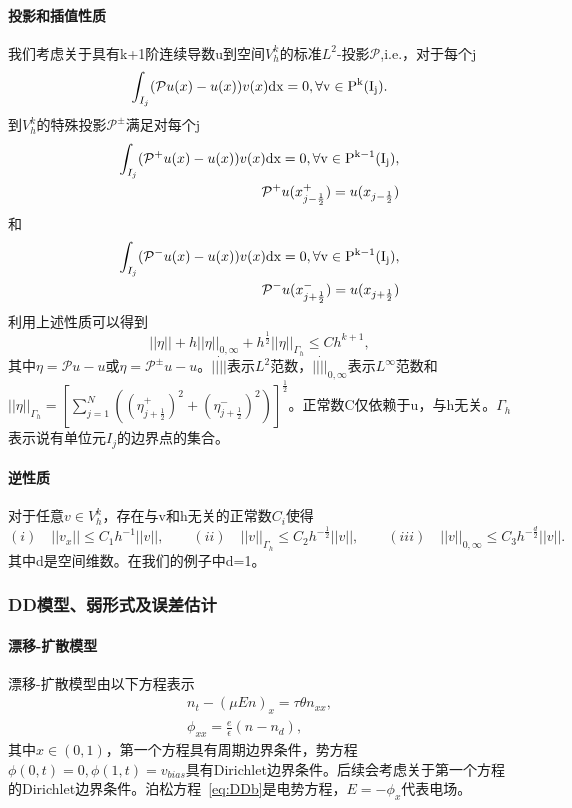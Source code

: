 \paragraph{投影和插值性质}
我们考虑关于具有k+1阶连续导数u到空间$V_h^k$的标准$L^2$-投影$\mathcal{P}$,i.e.，对于每个j
\begin{equation*}
    \int_{I_j}(\mathcal{P}u(x) - u(x))v(x)\rm{d} x = 0, \forall v \in P^k(I_j).
\end{equation*}
到$V_h^k$的特殊投影$\mathcal{P}^{\pm}$满足对每个j
\begin{align*}
    \int_{I_j}(\mathcal{P}^+u(x) - u(x))v(x)\rm{d} x = 0, \forall v \in P^{k-1}(I_j), \\
    \mathcal{P}^+u(x_{j-\frac{1}{2}}^+) = u(x_{j-\frac{1}{2}})
\end{align*}
和
\begin{align*}
    \int_{I_j}(\mathcal{P}^-u(x) - u(x))v(x)\rm{d} x = 0, \forall v \in P^{k-1}(I_j), \\
    \mathcal{P}^-u(x_{j+\frac{1}{2}}^-) = u(x_{j+\frac{1}{2}})
\end{align*}
利用上述性质可以得到
\begin{equation}
    ||\eta|| + h||\eta||_{0,\infty} + h^{\frac{1}{2}}||\eta||_{\Gamma_h} \leq Ch^{k+1},
\end{equation}
其中$\eta = \mathcal{P}u - u$或$\eta = \mathcal{P}^{\pm}u - u$。$||\dot||$表示$L^2$范数，$||\dot||_{0,\infty}$表示$L^{\infty}$范数和$||\eta||_{\Gamma_h} = [\sum_{j=1}^{N}((\eta_{j+\frac{1}{2}}^+)^2 + (\eta_{j+\frac{1}{2}}^-)^2)]^{\frac{1}{2}}$。正常数C仅依赖于u，与h无关。$\Gamma_h$表示说有单位元$I_j$的边界点的集合。
\paragraph{逆性质}
对于任意$v \in V_h^k$，存在与v和h无关的正常数$C_i$使得
\begin{equation}
    (i)\quad  ||v_x|| \leq C_1 h^{-1} ||v||, \qquad
    (ii)\quad||v||_{\Gamma_h} \leq C_2 h^{-\frac{1}{2}}||v||, \qquad
    (iii)\quad ||v||_{0,\infty} \leq C_3 h^{-\frac{d}{2}}||v||.
\end{equation}
其中d是空间维数。在我们的例子中d=1。

\subsubsection{DD模型、弱形式及误差估计}
\paragraph{漂移-扩散模型}
漂移-扩散模型由以下方程表示
\begin{align}
    n_t - (\mu En)_x = \tau \theta n_{xx}, \label{eq:DDa} \\
    \phi_{xx} = \frac{e}{\epsilon}(n - n_d),  \label{eq:DDb}
\end{align}
其中$x \in (0,1)$，第一个方程具有周期边界条件，势方程$\phi(0,t) = 0, \phi(1,t) = v_{bias}$具有Dirichlet边界条件。后续会考虑关于第一个方程的Dirichlet边界条件。泊松方程~\eqref{eq:DDb}是电势方程，$E = -\phi_x$代表电场。

